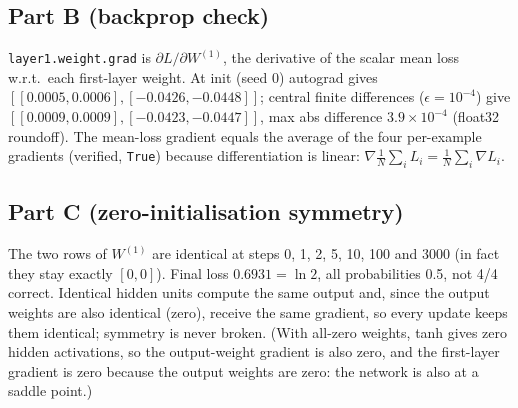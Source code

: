 \documentclass[10pt,a4paper]{article}
\begin{document}
\subsection*{Part B (backprop check)}
\texttt{layer1.weight.grad} is $\partial L/\partial W^{(1)}$, the derivative of the scalar mean loss w.r.t.\ each first-layer weight. At init (seed 0) autograd gives $[[0.0005,0.0006],[-0.0426,-0.0448]]$; central finite differences ($\epsilon=10^{-4}$) give $[[0.0009,0.0009],[-0.0423,-0.0447]]$, max abs difference $3.9\times10^{-4}$ (float32 roundoff). The mean-loss gradient equals the average of the four per-example gradients (verified, \texttt{True}) because differentiation is linear: $\nabla\frac1N\sum_i L_i=\frac1N\sum_i\nabla L_i$.

\subsection*{Part C (zero-initialisation symmetry)}
The two rows of $W^{(1)}$ are identical at steps 0, 1, 2, 5, 10, 100 and 3000 (in fact they stay exactly $[0,0]$). Final loss $0.6931=\ln2$, all probabilities 0.5, not 4/4 correct. Identical hidden units compute the same output and, since the output weights are also identical (zero), receive the same gradient, so every update keeps them identical; symmetry is never broken. (With all-zero weights, tanh gives zero hidden activations, so the output-weight gradient is also zero, and the first-layer gradient is zero because the output weights are zero: the network is also at a saddle point.)
\end{document}
